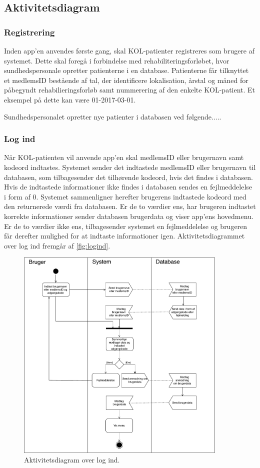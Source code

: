 \subsection{Aktivitetsdiagram}


\subsubsection{Registrering}
Inden app'en anvendes første gang, skal KOL-patienter registreres som brugere af systemet. Dette skal foregå i forbindelse med rehabiliteringsforløbet, hvor sundhedspersonale opretter patienterne i en database. Patienterne får tilknyttet et medlemsID bestående af tal, der identificere lokalisation, årstal og måned for påbegyndt rehabilieringsforløb samt nummerering af den enkelte KOL-patient. Et eksempel på dette kan være 01-2017-03-01. 

Sundhedspersonalet opretter nye patienter i databasen ved følgende.....

\subsubsection{Log ind}
Når KOL-patienten vil anvende app'en skal medlemsID eller brugernavn samt kodeord indtastes. Systemet sender det indtastede medlemsID eller brugernavn til databasen, som tilbagesender det tilhørende kodeord, hvis det findes i databasen. Hvis de indtastede informationer ikke findes i databasen sendes en fejlmeddelelse i form af 0. Systemet sammenligner herefter brugerens indtastede kodeord med den returnerede værdi fra databasen. Er de to værdier ens, har brugeren indtastet korrekte informationer sender databasen brugerdata og viser app'ens hovedmenu. Er de to værdier ikke ens, tilbagesender systemet en fejlmeddelelse og brugeren får derefter mulighed for at indtaste informationer igen. Aktivitetsdiagrammet over log ind fremgår af  \autoref{fig:logind}.

\begin{figure} [H]
\centering
\includegraphics[width=0.9\textwidth]{figures/aktivitetsdiagram/Logind}
\caption{Aktivitetsdiagram over log ind.}
\label{fig:Logind}
\end{figure}



